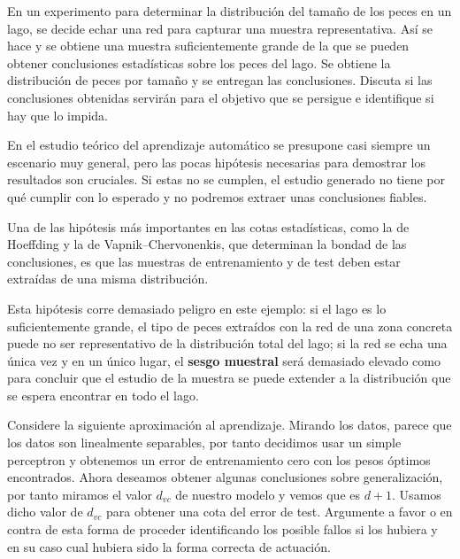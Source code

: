 \documentclass[a4paper, 11pt]{article}
\begin{document}
\begin{solucion}
      \begin{ejercicio}
        En un experimento para determinar la distribución del tamaño de los peces en un lago, se decide echar una red para capturar una muestra representativa. Así se hace y se obtiene una muestra suficientemente grande de la que se pueden obtener conclusiones estadísticas sobre los peces del lago. Se obtiene la distribución de peces por tamaño y se entregan las conclusiones. Discuta si las conclusiones obtenidas servirán para el objetivo que se persigue e identifique si hay que lo impida.
      \end{ejercicio}

      \begin{solucion}
          En el estudio teórico del aprendizaje automático se presupone casi siempre un escenario muy general, pero las pocas hipótesis necesarias para demostrar los resultados son cruciales. Si estas no se cumplen, el estudio generado no tiene por qué cumplir con lo esperado y no podremos extraer unas conclusiones fiables.

          Una de las hipótesis más importantes en las cotas estadísticas, como la de Hoeffding y la de Vapnik–Chervonenkis, que determinan la bondad de las conclusiones, es que las muestras de entrenamiento y de test deben estar extraídas de una misma distribución.

          Esta hipótesis corre demasiado peligro en este ejemplo: si el lago es lo suficientemente grande, el tipo de peces extraídos con la red de una zona concreta puede no ser representativo de la distribución total del lago; si la red se echa una única vez y en un único lugar, el \textbf{sesgo muestral} será demasiado elevado como para concluir que el estudio de la muestra se puede extender a la distribución que se espera encontrar en todo el lago.
      \end{solucion}

      \begin{ejercicio}
        Considere la siguiente aproximación al aprendizaje. Mirando los datos, parece que los datos son linealmente separables, por tanto decidimos usar un simple perceptron y obtenemos un error de entrenamiento cero con los pesos óptimos encontrados. Ahora deseamos obtener algunas conclusiones sobre generalización, por tanto miramos el valor $d_{vc}$ de nuestro modelo y vemos que es $d+1$. Usamos dicho valor de $d_{vc}$ para obtener una cota del error de test.  Argumente a favor o en contra de esta forma de proceder identificando los posible fallos si los hubiera y en su caso cual hubiera sido la forma correcta de actuación.
      \end{ejercicio}


\end{solucion}
\end{document}
